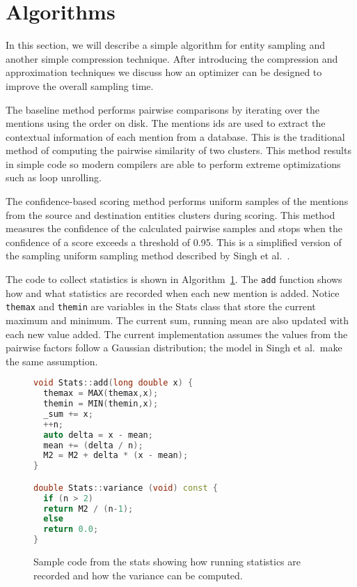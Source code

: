 

\section{Algorithms}
\label{sec:optimizer:algorithms}

In this section, we will describe a simple algorithm for entity sampling and
another simple compression technique.
After introducing the compression and approximation techniques we discuss how
an optimizer can be designed to improve the overall sampling time.

The baseline method performs pairwise comparisons by 
iterating over the mentions using the order on disk.
The mentions ids are used to extract the contextual information of each mention from a database.
This is the traditional method of computing the pairwise similarity of two clusters. 
This method results in simple code so modern compilers are able to perform extreme
optimizations such as loop unrolling.

The confidence-based scoring method performs uniform samples of the
mentions from the source and destination entities clusters during scoring. This method
measures the confidence of the calculated pairwise samples and stops when the
confidence of a score exceeds a threshold of 0.95.
This is a simplified version of the sampling uniform sampling method described by Singh et al.~\cite{singh2012monte}.

The code to collect statistics is shown in Algorithm~\ref{algo:stats}.
The \texttt{add} function shows how and what statistics are recorded when each new mention is added.
Notice \texttt{themax} and \texttt{themin} are variables in the Stats class that
store the current maximum and minimum.
The current sum, running mean are also updated with each new value added.
The current implementation assumes the values from the pairwise factors follow a Gaussian distribution;
the model in Singh et al.\ make the same assumption.

\begin{figure}
\centering
\begin{lstlisting}[language=c++,breaklines=true,keywordstyle=\color{blue},stringstyle=\color{red},commentstyle=\color{green}]
void Stats::add(long double x) {
  themax = MAX(themax,x);
  themin = MIN(themin,x);
  _sum += x;                   
  ++n;
  auto delta = x - mean;       
  mean += (delta / n);         
  M2 = M2 + delta * (x - mean);
} 

double Stats::variance (void) const {
  if (n > 2)  
  return M2 / (n-1);
  else
  return 0.0;
} 

\end{lstlisting}
\caption{Sample code from the stats showing how running statistics are recorded and how the variance can be computed.}
\label{algo:stats}
\end{figure}


